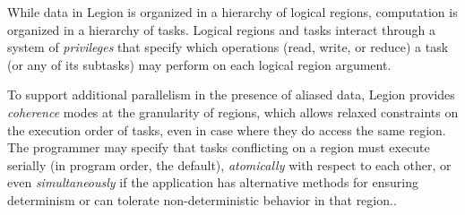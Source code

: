 While data in Legion is organized in a hierarchy of logical regions,
computation is organized in a hierarchy of tasks.  Logical regions and tasks interact
through a system of {\em privileges} that specify which operations (read, write, or reduce)
a task (or any of its subtasks) may perform on each logical region argument.  


To support additional parallelism in the presence of aliased data,
Legion provides {\em coherence} modes at the granularity of regions, which allows
relaxed constraints on the execution order of tasks, even in case where they
do access the same region.  The programmer may
specify that tasks conflicting on a region  must execute serially (in program
order, the default), {\em atomically} with respect to each other, or even
{\em simultaneously} if the application has alternative methods for ensuring
determinism or can tolerate non-deterministic behavior in that region..

